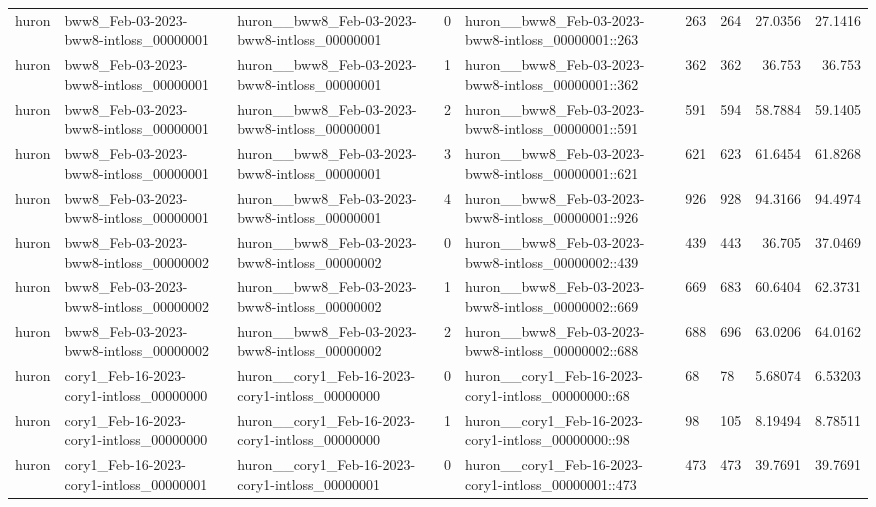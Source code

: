 \begin{longtable}{lllrlllrr}
huron & bww8\_Feb-03-2023-bww8-intloss\_00000001 & huron\_\_bww8\_Feb-03-2023-bww8-intloss\_00000001 & 0 & huron\_\_bww8\_Feb-03-2023-bww8-intloss\_00000001::263 & 263 & 264 & 27.0356 & 27.1416 \\
huron & bww8\_Feb-03-2023-bww8-intloss\_00000001 & huron\_\_bww8\_Feb-03-2023-bww8-intloss\_00000001 & 1 & huron\_\_bww8\_Feb-03-2023-bww8-intloss\_00000001::362 & 362 & 362 & 36.753 & 36.753 \\
huron & bww8\_Feb-03-2023-bww8-intloss\_00000001 & huron\_\_bww8\_Feb-03-2023-bww8-intloss\_00000001 & 2 & huron\_\_bww8\_Feb-03-2023-bww8-intloss\_00000001::591 & 591 & 594 & 58.7884 & 59.1405 \\
huron & bww8\_Feb-03-2023-bww8-intloss\_00000001 & huron\_\_bww8\_Feb-03-2023-bww8-intloss\_00000001 & 3 & huron\_\_bww8\_Feb-03-2023-bww8-intloss\_00000001::621 & 621 & 623 & 61.6454 & 61.8268 \\
huron & bww8\_Feb-03-2023-bww8-intloss\_00000001 & huron\_\_bww8\_Feb-03-2023-bww8-intloss\_00000001 & 4 & huron\_\_bww8\_Feb-03-2023-bww8-intloss\_00000001::926 & 926 & 928 & 94.3166 & 94.4974 \\
huron & bww8\_Feb-03-2023-bww8-intloss\_00000002 & huron\_\_bww8\_Feb-03-2023-bww8-intloss\_00000002 & 0 & huron\_\_bww8\_Feb-03-2023-bww8-intloss\_00000002::439 & 439 & 443 & 36.705 & 37.0469 \\
huron & bww8\_Feb-03-2023-bww8-intloss\_00000002 & huron\_\_bww8\_Feb-03-2023-bww8-intloss\_00000002 & 1 & huron\_\_bww8\_Feb-03-2023-bww8-intloss\_00000002::669 & 669 & 683 & 60.6404 & 62.3731 \\
huron & bww8\_Feb-03-2023-bww8-intloss\_00000002 & huron\_\_bww8\_Feb-03-2023-bww8-intloss\_00000002 & 2 & huron\_\_bww8\_Feb-03-2023-bww8-intloss\_00000002::688 & 688 & 696 & 63.0206 & 64.0162 \\
huron & cory1\_Feb-16-2023-cory1-intloss\_00000000 & huron\_\_cory1\_Feb-16-2023-cory1-intloss\_00000000 & 0 & huron\_\_cory1\_Feb-16-2023-cory1-intloss\_00000000::68 & 68 & 78 & 5.68074 & 6.53203 \\
huron & cory1\_Feb-16-2023-cory1-intloss\_00000000 & huron\_\_cory1\_Feb-16-2023-cory1-intloss\_00000000 & 1 & huron\_\_cory1\_Feb-16-2023-cory1-intloss\_00000000::98 & 98 & 105 & 8.19494 & 8.78511 \\
huron & cory1\_Feb-16-2023-cory1-intloss\_00000001 & huron\_\_cory1\_Feb-16-2023-cory1-intloss\_00000001 & 0 & huron\_\_cory1\_Feb-16-2023-cory1-intloss\_00000001::473 & 473 & 473 & 39.7691 & 39.7691 \\

\end{longtable}
